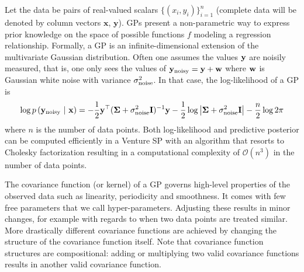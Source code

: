 
Let the data be pairs of real-valued scalars $\{(x_i,y_i)\}_{i=1}^n$
(complete data will be denoted by column vectors $\mathbf{x}$, $\mathbf{y}$).
\ac{GP}s present a non-parametric way to express prior knowledge on the space of possible functions $f$ modeling
a regression relationship.
Formally, a GP is an infinite-dimensional extension of the multivariate Gaussian distribution.
Often one assumes the values $\mathbf{y}$ are noisily measured, that is, one only sees the values of $\mathbf{y}_{\textrm{noisy}} = \mathbf{y} + \mathbf{w}$ where $\mathbf{w}$ is Gaussian white noise with variance $\sigma_{\textrm{noise}}^2$.
In that case, the log-likelihood of a \ac{GP} is
\begin{equation}
\log p\left( \mathbf{y}_{\textrm{noisy}} \ \middle\vert\  \mathbf{x} \right) =
-\frac12 \mathbf{y}^\top (\bm{\Sigma}
+ \sigma_{\textrm{noise}}^2 \mathbf{I})^{-1} \mathbf{y}
- \frac12\log \left\lvert \bm{\Sigma} + \sigma_{\textrm{noise}}^2 \mathbf{I} \right\rvert
- \frac{n}{2}\log 2\pi
\end{equation}
where $n$ is the number of data points.
Both log-likelihood and predictive posterior can be computed efficiently in a Venture SP with an algorithm that resorts to Cholesky factorization\citep[chap. 2]{rasmussen2006gaussian} resulting in a computational complexity of $\mathcal{O}(n^3)$ in the number of data points.



The covariance function (or kernel) of a \ac{GP} governs high-level properties of the observed data such as linearity, periodicity and smoothness.
It comes with few free parameters that we call hyper-parameters.
Adjusting these results in minor changes, for example with regards to when two data points are treated similar.
More drastically different covariance functions are achieved by changing the structure of the covariance function itself.
Note that covariance function structures are compositional: adding or multiplying two valid covariance functions results in another valid covariance function. 







